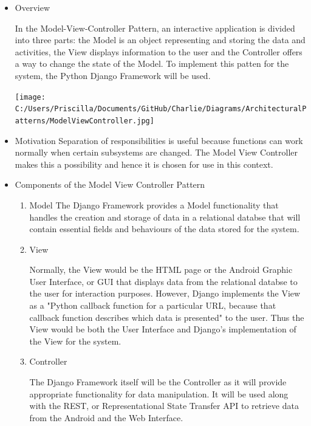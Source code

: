 \documentclass{article}
\begin{document}
\begin{itemize}
\item{Overview}

In the Model-View-Controller Pattern, an interactive application is divided into three parts: the Model is an object representing and storing the data and activities, the View displays information to the user and the Controller offers a way to change the state of the Model. To implement this patten for the system, the Python Django Framework will be used.

\begin{minipage}{\linewidth} 
\centering
\texttt{[image: C:/Users/Priscilla/Documents/GitHub/Charlie/Diagrams/ArchitecturalPatterns/ModelViewController.jpg]}
\end{minipage}

\item{Motivation}
\newline
Separation of responsibilities is useful because functions can work normally when certain subsystems are changed. The Model View Controller makes this a possibility and hence it is chosen for use in this context. 

\item{Components of the Model View Controller Pattern}
\begin{enumerate}
\item{Model}
\newline
The Django Framework provides a Model functionality that handles the creation and storage of data in a relational databse that will contain essential fields and behaviours of the data stored for the system.
\newline

\item{View}

Normally, the View would be the HTML page or the Android Graphic User Interface, or GUI that displays data from the relational databse to the user for interaction purposes. However, Django implements the View as a "Python callback function for a particular  URL, because that callback function describes which data is presented" to the user. Thus the View would be both the User Interface and Django's  implementation of the View for the system.
\newline
\item{Controller}

The Django Framework itself will be the Controller as it will provide appropriate functionality for data manipulation. It will be used along with the REST, or Representational State Transfer API to retrieve data from the Android and the Web Interface.

\end{enumerate}
\end{itemize}
\end{document}
